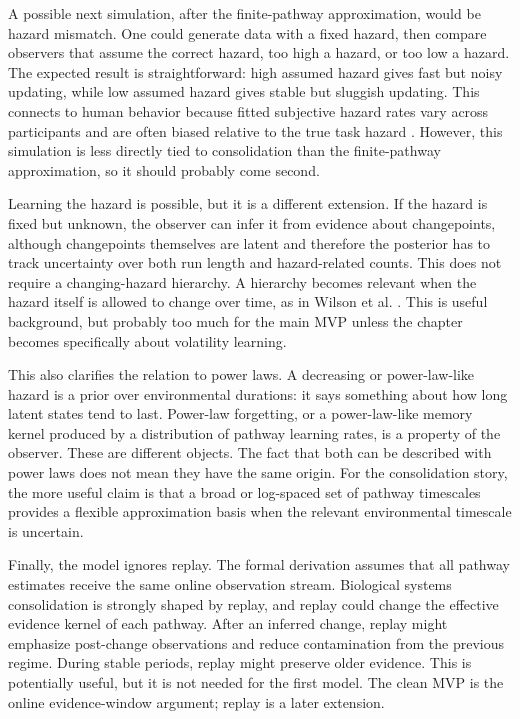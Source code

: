 A possible next simulation, after the finite-pathway approximation, would be hazard mismatch. One could generate data with a fixed hazard, then compare observers that assume the correct hazard, too high a hazard, or too low a hazard. The expected result is straightforward: high assumed hazard gives fast but noisy updating, while low assumed hazard gives stable but sluggish updating. This connects to human behavior because fitted subjective hazard rates vary across participants and are often biased relative to the true task hazard \citep{Nassar2010}. However, this simulation is less directly tied to consolidation than the finite-pathway approximation, so it should probably come second.

Learning the hazard is possible, but it is a different extension. If the hazard is fixed but unknown, the observer can infer it from evidence about changepoints, although changepoints themselves are latent and therefore the posterior has to track uncertainty over both run length and hazard-related counts. This does not require a changing-hazard hierarchy. A hierarchy becomes relevant when the hazard itself is allowed to change over time, as in Wilson et al. \citep{Wilson2010}. This is useful background, but probably too much for the main MVP unless the chapter becomes specifically about volatility learning.

This also clarifies the relation to power laws. A decreasing or power-law-like hazard is a prior over environmental durations: it says something about how long latent states tend to last. Power-law forgetting, or a power-law-like memory kernel produced by a distribution of pathway learning rates, is a property of the observer. These are different objects. The fact that both can be described with power laws does not mean they have the same origin. For the consolidation story, the more useful claim is that a broad or log-spaced set of pathway timescales provides a flexible approximation basis when the relevant environmental timescale is uncertain.

Finally, the model ignores replay. The formal derivation assumes that all pathway estimates receive the same online observation stream. Biological systems consolidation is strongly shaped by replay, and replay could change the effective evidence kernel of each pathway. After an inferred change, replay might emphasize post-change observations and reduce contamination from the previous regime. During stable periods, replay might preserve older evidence. This is potentially useful, but it is not needed for the first model. The clean MVP is the online evidence-window argument; replay is a later extension.

